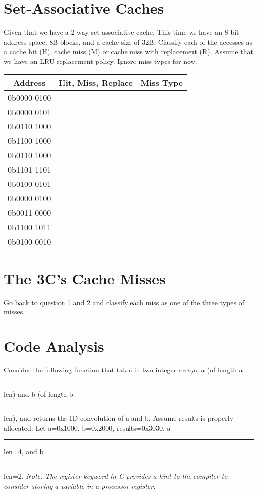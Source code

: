 \documentclass{article}
\begin{document}
\section{Set-Associative Caches}
Given that we have a 2-way set associative cache. This time we have an 8-bit address space, 8B blocks, and a cache size of 32B. Classify each of the accesses as a cache hit (H), cache miss (M) or cache miss with replacement (R). Assume that we have an LRU replacement policy. Ignore miss types for now.\\
\begin{table}[H]
    \centering
    \ttfamily
    \begin{tabular}{|c|c|c|}
        \hline
        Address                 & Hit, Miss, Replace & Miss Type\\ \hline
        0b0000 0100                   &                    & \\ \hline
        0b0000 0101                   &                    & \\ \hline
        0b0110 1000                   &                    & \\ \hline
        0b1100 1000                   &                    & \\ \hline
        0b0110 1000                   &                    & \\ \hline
        0b1101 1101                   &                    & \\ \hline
        0b0100 0101                   &                    & \\ \hline
        0b0000 0100                   &                    & \\ \hline
        0b0011 0000                   &                    & \\ \hline
        0b1100 1011                   &                    & \\ \hline
        0b0100 0010                   &                    & \\ \hline
    \end{tabular}
\end{table}

\section{The 3C's Cache Misses}
Go back to question 1 and 2 and classify each miss as one of the three types of misses.\\

\section{Code Analysis}
Consider the following function that takes in two integer arrays, a (of length a\rule{0.2cm}{0.4pt}len) and b (of length b\rule{0.2cm}{0.4pt}len), and returns the 1D convolution of a and b. Assume results is properly allocated.
Let a=0x1000, b=0x2000, results=0x3030, a\rule{0.2cm}{0.4pt}len=4, and b\rule{0.2cm}{0.4pt}len=2. \textit{Note: The register keyword in C provides a hint to the compiler to consider storing a variable in a processor register. }
\end{document}
